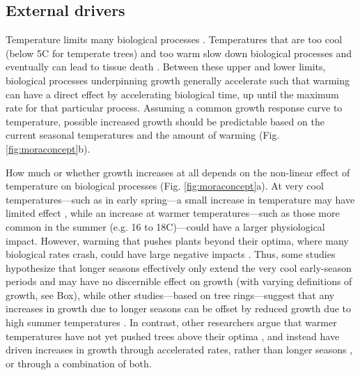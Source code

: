 \documentclass[11pt]{article}
\newcommand{\R}[1]{\label{#1}\linelabel{#1}}
\begin{document}
\subsection*{External drivers}

Temperature limits many biological processes \citep{korner2015paradigm}\R{forbigKref0}. Temperatures that are too cool (below 5\degree C for temperate trees) and too warm \citep[an area of active research, but likely between 35-45\degree C;][]{martinez2008hot,cabon2022cross} slow down biological processes and eventually can lead to tissue death \R{morebox}\citep[see Fig. \ref{fig:moraconcept}a, Box,][]{larcher1980,kramer2012book}. Between these upper and lower limits, biological processes underpinning growth generally accelerate such that warming can have a direct effect by accelerating biological time, up until the maximum rate for that particular process. Assuming a common growth response curve to temperature, possible increased growth should be predictable based on the current seasonal temperatures and the amount of warming (Fig. \ref{fig:moraconcept}b). 

How much or whether growth increases at all depends on the non-linear effect of temperature on biological processes (Fig. \ref{fig:moraconcept}a). At very cool temperatures---such as in early spring---a small increase in temperature may have limited effect \citep[or even increase frost risk through early budburst, Fig. \ref{fig:hypotheses}e,][]{cat2021pep}, while an increase at warmer temperatures---such as those more common in the summer (e.g. 16 to 18\degree C)---could have a larger physiological impact. However, warming that pushes plants beyond their optima, where many biological rates crash, could have large negative impacts \citep{nobel1983biophysical,leuning2002temperature}. Thus, some studies hypothesize that longer seasons effectively only extend the very cool early-season periods and may have no discernible effect on growth (with varying definitions of growth, see Box), while other studies---based on tree rings---suggest that any increases in growth due to longer seasons can be offset by reduced growth due to high summer temperatures \citep[Fig. \ref{fig:hypotheses},][]{gantois2022new,dow2022warm}. In contrast, other researchers argue that warmer temperatures have not yet pushed trees above their optima \citep{schaber2002evaluation}, and instead have driven increases in growth through accelerated rates, rather than longer seasons \citep[e.g.][]{ren2019}, or through a combination of both.
\end{document}
